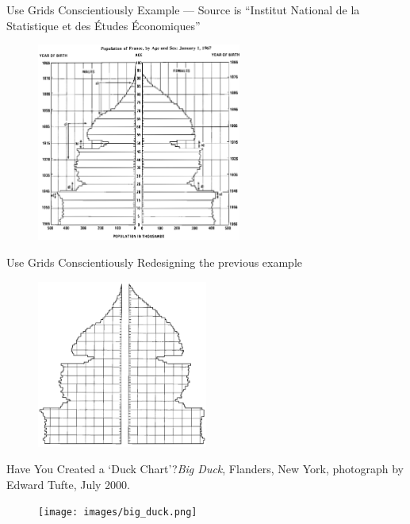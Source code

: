 \documentclass[aspectratio=1610]{beamer}
\begin{document}
\begin{frame}
	{Use Grids Conscientiously}
	{Example --- Source is ``Institut National de la Statistique et des
		\'Etudes \'Economiques''}
	\centering
	\begin{figure}
		\includegraphics[width=0.6\textwidth]{images/grid_1.png}
	\end{figure}
\end{frame}

\begin{frame}
	{Use Grids Conscientiously}
	{Redesigning the previous example}
	\centering
	\begin{figure}
		\includegraphics[width=0.5\textwidth]{images/grid_2.png}
	\end{figure}
\end{frame}

\begin{frame}{Have You Created a `Duck Chart'?}{\textit{Big Duck}, Flanders,
		New York, photograph by Edward Tufte, July 2000.}
	\begin{figure}
		\begin{center}
			\texttt{[image: images/big\_duck.png]}
		\end{center}
	\end{figure}
\end{frame}
\end{document}
